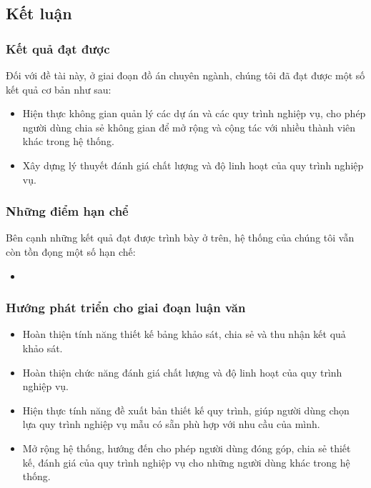 \subsection{Kết luận}
\subsubsection{Kết quả đạt được}
Đối với đề tài này, ở giai đoạn đồ án chuyên ngành, chúng tôi đã đạt được một số kết quả cơ bản như sau:
\begin{itemize}
    \item Hiện thực không gian quản lý các dự án và các quy trình nghiệp vụ, cho phép người dùng chia sẻ không gian để mở rộng và cộng tác với nhiều thành viên khác trong hệ thống.
    \item Xây dựng lý thuyết đánh giá chất lượng và độ linh hoạt của quy trình nghiệp vụ.
\end{itemize}
\subsubsection{Những điểm hạn chể}
Bên cạnh những kết quả đạt được trình bày ở trên, hệ thống của chúng tôi vẫn còn tồn đọng một số hạn chế:
\begin{itemize}
    \item 
\end{itemize}
\subsubsection{Hướng phát triển cho giai đoạn luận văn}
\begin{itemize}
    \item Hoàn thiện tính năng thiết kế bảng khảo sát, chia sẻ và thu nhận kết quả khảo sát.
    \item Hoàn thiện chức năng đánh giá chất lượng và độ linh hoạt của quy trình nghiệp vụ.
    \item Hiện thực tính năng đề xuất bản thiết kế quy trình, giúp người dùng chọn lựa quy trình nghiệp vụ mẫu có sẵn phù hợp với nhu cầu của mình.
    \item Mở rộng hệ thống, hướng đến cho phép người dùng đóng góp, chia sẻ thiết kế, đánh giá của quy trình nghiệp vụ cho những người dùng khác trong hệ thống.
\end{itemize}